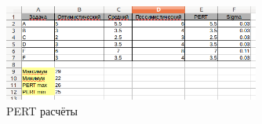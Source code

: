 \begin{figure}[h]
\begin{center}
\includegraphics[width=0.75\textwidth]{PERT}
\caption{PERT расчёты}
\end{center}
\label{fig:figure3}
\end{figure}
